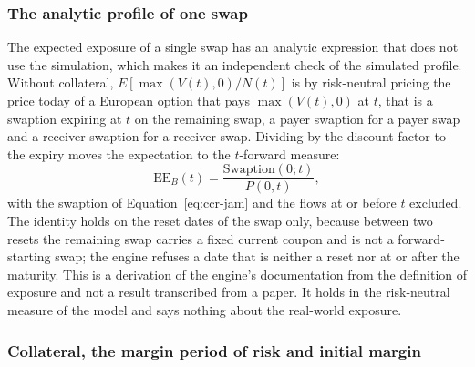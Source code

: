 \subsubsection{The analytic profile of one swap}

The expected exposure of a single swap has an analytic expression that does not use the simulation, which makes it an independent check of the simulated profile. Without collateral, $E[\max(V(t),0)/N(t)]$ is by risk-neutral pricing the price today of a European option that pays $\max(V(t),0)$ at
$t$, that is a swaption expiring at $t$ on the remaining swap, a payer swaption for a payer swap and a receiver swaption for a receiver swap. Dividing by the discount factor to the expiry moves the expectation to the $t$-forward measure:
\begin{equation}
\mathrm{EE}_B(t)=\frac{\mathrm{Swaption}(0;t)}{P(0,t)},
\label{eq:ccr-analytic}
\end{equation}
with the swaption of Equation~\ref{eq:ccr-jam} and the flows at or before $t$ excluded. The identity holds on the reset dates of the swap only, because between two resets the remaining swap carries a fixed current coupon and is not a forward-starting swap; the engine refuses a date that is neither a reset nor at or after the maturity. This is a derivation of the
engine's documentation from the definition of exposure and not a result transcribed from a paper. It holds in the risk-neutral measure of the model and says nothing about the real-world exposure.

\subsubsection{Collateral, the margin period of risk and initial margin}

